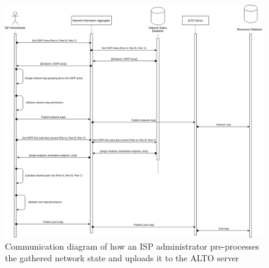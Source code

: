\begin{figure}[!h]
        \centering
        \includegraphics[scale=0.3]{img/info-provisioning-isp.png}
        \caption{Communication diagram of how an ISP administrator pre-processes the gathered network state and uploads it to the ALTO server}
        \label{fig:provisioning-isp}
\end{figure}

